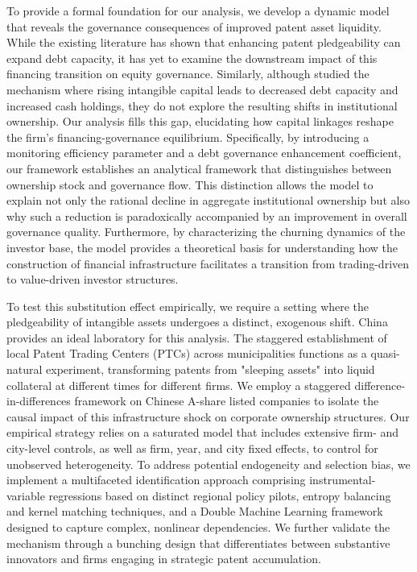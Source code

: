 \documentclass[12pt,a4paper]{article}
\begin{document}
To provide a formal foundation for our analysis, we develop a dynamic model that reveals the governance consequences of improved patent asset liquidity. While the existing literature \citep{mann2018creditor, hochberg2018patent} has shown that enhancing patent pledgeability can expand debt capacity, it has yet to examine the downstream impact of this financing transition on equity governance. Similarly, although \cite{falato2022rising} studied the mechanism where rising intangible capital leads to decreased debt capacity and increased cash holdings, they do not explore the resulting shifts in institutional ownership. Our analysis fills this gap, elucidating how capital linkages reshape the firm's financing-governance equilibrium. Specifically, by introducing a monitoring efficiency parameter and a debt governance enhancement coefficient, our framework establishes an analytical framework that distinguishes between ownership stock and governance flow. This distinction allows the model to explain not only the rational decline in aggregate institutional ownership but also why such a reduction is paradoxically accompanied by an improvement in overall governance quality. Furthermore, by characterizing the churning dynamics of the investor base, the model provides a theoretical basis for understanding how the construction of financial infrastructure facilitates a transition from trading-driven to value-driven investor structures.

To test this substitution effect empirically, we require a setting where the pledgeability of intangible assets undergoes a distinct, exogenous shift. China provides an ideal laboratory for this analysis. The staggered establishment of local Patent Trading Centers (PTCs) across municipalities functions as a quasi-natural experiment, transforming patents from "sleeping assets" into liquid collateral at different times for different firms. We employ a staggered difference-in-differences framework on Chinese A-share listed companies to isolate the causal impact of this infrastructure shock on corporate ownership structures. Our empirical strategy relies on a saturated model that includes extensive firm- and city-level controls, as well as firm, year, and city fixed effects, to control for unobserved heterogeneity. To address potential endogeneity and selection bias, we implement a multifaceted identification approach comprising instrumental-variable regressions based on distinct regional policy pilots, entropy balancing and kernel matching techniques, and a Double Machine Learning framework designed to capture complex, nonlinear dependencies. We further validate the mechanism through a bunching design that differentiates between substantive innovators and firms engaging in strategic patent accumulation.
\end{document}
